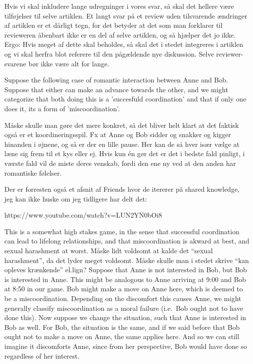 \documentclass[a4paper]{article}
\newenvironment{tsn}{\smallskip \noindent \color{purple}}{\color{black}\smallskip}
\newenvironment{tobo}{\smallskip \noindent \color{yellow!80!black!80}}{\color{black}\smallskip}
\begin{document}
\begin{tsn}
\begin{tobo}
Hvis vi skal inkludere lange udregninger i vores svar, så skal det hellere være tilføjelser til selve artiklen. Et langt svar på et review uden tilsvarende ændringer af artiklen er et dårligt tegn, for det betyder at det som man forklarer til revieweren åbenbart ikke er en del af selve artiklen, og så hjælper det jo ikke. Ergo: Hvis meget af dette skal beholdes, så skal det i stedet integreres i artiklen og vi skal herfra blot referere til den pågældende nye diskussion. Selve reviewer-svarene bør ikke være alt for lange.
\end{tobo}

Suppose the following case of romantic interaction between Anne and Bob. Suppose that either can make an advance towards the other, and we might categorize that both doing this is a 'succesfuld coordination' and that if only one does it, its a form of 'miscoordination'.

\begin{tobo}
Måske skulle man gøre det mere konkret, så det bliver helt klart at det faktisk også er et koordineringsspil. Fx at Anne og Bob sidder og snakker og kigger hinanden i øjnene, og så er der en lille pause. Her kan de så hver især vælge at læne sig frem til et kys eller ej. Hvis kun én gør det er det i bedste fald pinligt, i værste fald vil de miste deres venskab, fordi den ene ny ved at den anden har romantiske følelser. 

Der er forresten også et afsnit af Friends hvor de itererer på shared knowledge, jeg kan ikke huske om jeg tidligere har delt det: 

https://www.youtube.com/watch?v=LUN2YN0bOi8
\end{tobo}

This is a somewhat high stakes game, in the sense that successful coordination can lead to lifelong relationships, and that miscoordination is akward at best, and sexual harashment at worst.
\begin{tobo}
Måske lidt voldsomt at kalde det ``sexual harashment'', da det lyder meget voldsomt. Måske skulle man i stedet skrive ``kan opleves krænkende'' el.lign?
\end{tobo}
 Suppose that Anne is not interested in Bob, but Bob is interested in Anne. This might be analogous to Anne arriving at 9:00 and Bob at 8:50 in our game. Bob might make a move on Anne here, which is deemed to be a miscoordination. Depending on the discomfort this causes Anne, we might generally classify miscoordination as a moral failure (i.e.\ Bob ought not to have done this). Now suppose we change the situation, such that Anne is interested in Bob as well. For Bob, the situation is the same, and if we said before that Bob ought not to make a move on Anne, the same applies here. And so we can still imagine it discomforts Anne, since from her perspective, Bob would have done so regardless of her interest. 
 

\end{tsn}
\end{document}

